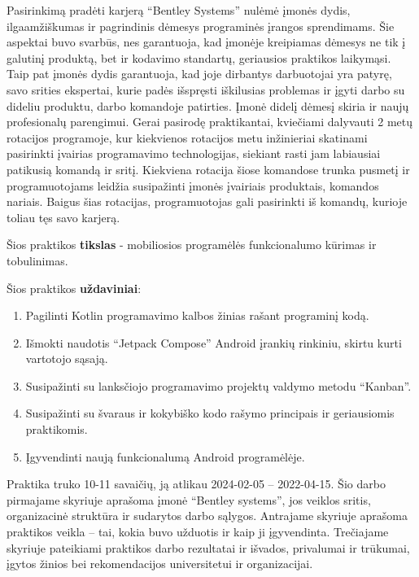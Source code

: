 Pasirinkimą pradėti karjerą \enquote{Bentley Systems} nulėmė įmonės dydis, ilgaamžiškumas ir pagrindinis dėmesys programinės įrangos sprendimams. Šie aspektai buvo svarbūs, nes garantuoja, kad įmonėje kreipiamas dėmesys ne tik į galutinį produktą, bet ir kodavimo standartų, geriausios praktikos laikymąsi. Taip pat įmonės dydis garantuoja, kad joje dirbantys darbuotojai yra patyrę, savo srities ekspertai, kurie padės išspręsti iškilusias problemas ir įgyti darbo su dideliu produktu, darbo komandoje patirties. Įmonė didelį dėmesį skiria ir naujų profesionalų parengimui. Gerai pasirodę praktikantai, kviečiami dalyvauti 2 metų rotacijos programoje, kur kiekvienos rotacijos metu inžinieriai skatinami pasirinkti įvairias programavimo technologijas, siekiant rasti jam labiausiai patikusią komandą ir sritį.
Kiekviena rotacija šiose komandose trunka pusmetį ir programuotojams leidžia  susipažinti įmonės įvairiais produktais, komandos nariais. Baigus šias rotacijas, programuotojas gali pasirinkti iš komandų, kurioje toliau tęs savo karjerą.
\bigskip

Šios praktikos \textbf{tikslas} - mobiliosios programėlės funkcionalumo kūrimas ir tobulinimas.
\bigskip

Šios praktikos \textbf{uždaviniai}:
\begin{enumerate}
    \item Pagilinti Kotlin programavimo kalbos žinias rašant programinį kodą.
    \item Išmokti naudotis “Jetpack Compose” Android įrankių rinkiniu, skirtu kurti vartotojo sąsają.
    \item Susipažinti su lanksčiojo programavimo projektų valdymo metodu “Kanban”.
    \item Susipažinti su švaraus ir kokybiško kodo rašymo principais ir geriausiomis praktikomis. 
    \item Įgyvendinti naują funkcionalumą Android programėlėje.
\end{enumerate}
\bigskip

Praktika truko 10-11 savaičių, ją atlikau 2024-02-05 -- 2022-04-15.
\bigskip
Šio darbo pirmajame skyriuje aprašoma įmonė \enquote{Bentley systems}, jos veiklos sritis, organizacinė struktūra ir sudarytos darbo sąlygos. Antrajame skyriuje aprašoma praktikos veikla -- tai, kokia buvo užduotis ir kaip ji įgyvendinta. Trečiajame skyriuje pateikiami praktikos darbo rezultatai ir išvados, privalumai ir trūkumai, įgytos žinios bei rekomendacijos universitetui ir organizacijai.

